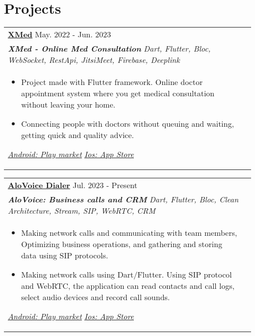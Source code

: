 \documentclass[a4paper,8pt]{article}
\begin{document}
\section{Projects}
\begin{tabularx}{\linewidth}{ @{}l r@{} }
\color[HTML]{1C033C} \textbf{\uline{\href{https://xmed.uz/}{XMed}}} \hfill \color[HTML]{371e77} May. 2022 - Jun. 2023 \\[4pt]
\color[HTML]{371e77}\textbf{\textit{XMed - Online Med Consultation}} \hfill \color[HTML]{4B28A4} \textit{Dart, Flutter, Bloc, WebSocket, RestApi, JitsiMeet, Firebase, Deeplink} \\[5pt]
\begin{minipage}[t]{\linewidth}
    \begin{itemize}[nosep,after=\strut, leftmargin=2em, itemsep=2pt]
        \item Project made with Flutter framework. Online doctor appointment system where you get medical consultation without leaving your home.
        \item Connecting people with doctors without queuing and waiting, getting quick and quality advice.
    \end{itemize}
     \color[HTML]{1C033C} \textit{\uline{\href{https://play.google.com/store/apps/details?id=com.telehealth.xmed}{Android: Play market}}}   
     \color[HTML]{1C033C} \textit{\uline{\href{https://apps.apple.com/uz/developer/xmed/id1580909768}{Ios: App Store}}}
    \end{minipage}
\end{tabularx}

\begin{tabularx}{\linewidth}{ @{}l r@{} }
\color[HTML]{1C033C} \textbf{\uline{\href{https://cld.alovoice.uz/}{AloVoice Dialer}}} \hfill \color[HTML]{371e77} Jul. 2023 - Present \\[4pt]
\color[HTML]{371e77}\textbf{\textit{AloVoice: Business calls and CRM}} \hfill \color[HTML]{4B28A4} \textit{Dart, Flutter, Bloc, Clean Architecture, Stream, SIP, WebRTC, CRM} \\[5pt]
\begin{minipage}[t]{\linewidth}
    \begin{itemize}[nosep,after=\strut, leftmargin=2em, itemsep=2pt]
        \item Making network calls and communicating with team members, Optimizing business operations, and gathering and storing data using SIP protocols.
        \item Making network calls using Dart/Flutter. Using SIP protocol and WebRTC, the application can read contacts and call logs, select audio devices and record call sounds.
    \end{itemize}
    \color[HTML]{1C033C} \textit{\uline{\href{https://play.google.com/store/apps/details?id=com.technounit.alovoice}{Android: Play market}}}   
     \color[HTML]{1C033C} \textit{\uline{\href{https://apps.apple.com/us/app/alovoice-dialer/id6463775543?platform=iphone}{Ios: App Store}}}
    \end{minipage}
\end{tabularx}
\end{document}
